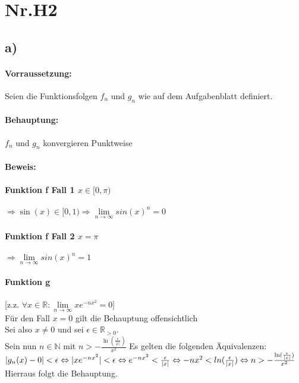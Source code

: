 \section*{Nr.H2}

\subsection*{a)}
\paragraph*{Vorraussetzung:} Seien die Funktionsfolgen $f_{n}$ und $g_{n}$ wie auf dem Aufgabenblatt definiert. 

\paragraph*{Behauptung:} $f_{n}$ und $g_{n}$ konvergieren Punktweise

\paragraph{Beweis:}

\paragraph*{Funktion f Fall 1 $ x \in [0,\pi) $}
$ \Rightarrow \sin(x) \in [0,1) \Rightarrow  \lim\limits_{n \to \infty} sin(x)^{n} = 0 $

\paragraph*{Funktion f Fall 2 $ x = \pi $}
$ \Rightarrow \lim\limits_{n \to \infty} sin(x)^{n} = 1 $


\paragraph*{Funktion g}
[z.z. $\forall x \in \mathbb{R} : \lim\limits_{n \to \infty}xe^{-nx^{2}} = 0$] \\
Für den Fall $x = 0$ gilt die Behauptung offensichtlich\\
Sei also $x \neq 0$ und sei $\epsilon \in \mathbb{R}_{>0}$. \\
Sein nun $n \in  \mathbb{N}$ mit $n > -\frac{\ln(\frac{\epsilon}{|x|})}{x^{2}}$
Es gelten die folgenden Äquivalenzen:\\
 $|g_{n}(x)-0|<\epsilon \\
 \Leftrightarrow |x e^{-nx^{2}}|<\epsilon \\
 \Leftrightarrow e^{-nx^{2}}<\frac{\epsilon}{|x|} \\
 \Leftrightarrow -nx^{2}<ln(\frac{\epsilon}{|x|}) \\
 \Leftrightarrow n > -\frac{\ln(\frac{\epsilon}{|x|})}{x^{2}} \\ $
 Hierraus folgt die Behauptung.
 



